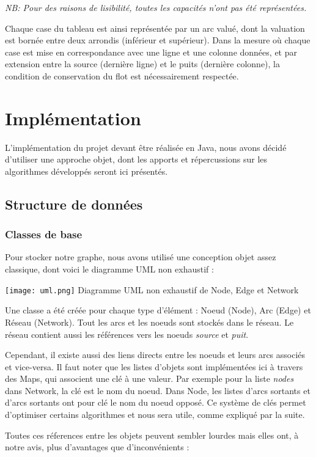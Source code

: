 \documentclass[letterpaper,12pt]{article}
\begin{document}
\textit{NB: Pour des raisons de lisibilité, toutes les capacités n'ont pas été représentées.}
\hfill \break

Chaque case du tableau est ainsi représentée par un arc valué, dont la valuation est bornée entre deux arrondis (inférieur et supérieur). Dans la mesure où chaque case est mise en correspondance avec une ligne et une colonne données, et par extension entre la source (dernière ligne) et le puits (dernière colonne), la condition de conservation du flot est nécessairement respectée.

\section{Implémentation}
L'implémentation du projet devant être réalisée en Java, nous avons décidé d'utiliser une approche objet, dont les apports et répercussions sur les algorithmes développés seront ici présentés.

\subsection{Structure de données}
\subsubsection{Classes de base}
Pour stocker notre graphe, nous avons utilisé une conception objet assez classique, dont voici le diagramme UML non exhaustif :
\begin{center}
    \texttt{[image: uml.png]}
    Diagramme UML non exhaustif de Node, Edge et Network
\end{center}
\hfill \break
Une classe a été créée pour chaque type d'élément : Noeud (Node), Arc (Edge) et Réseau (Network). Tout les arcs et les noeuds sont stockés dans le réseau. Le réseau contient aussi les références vers les noeuds \textit{source} et \textit{puit}.


Cependant, il existe aussi des liens directs entre les noeuds et leurs arcs associés et vice-versa. Il faut noter que les listes d'objets sont implémentées ici à travers des Maps, qui associent une clé à une valeur. Par exemple pour la liste \textit{nodes} dans Network, la clé est le nom du noeud. Dans Node, les listes d'arcs sortants et d'arcs sortants ont pour clé le nom du noeud opposé. Ce système de clés permet d'optimiser certains algorithmes et nous sera utile, comme expliqué par la suite.

Toutes ces réferences entre les objets peuvent sembler lourdes mais elles ont, à notre avis, plus d'avantages que d'inconvénients : 
\end{document}
